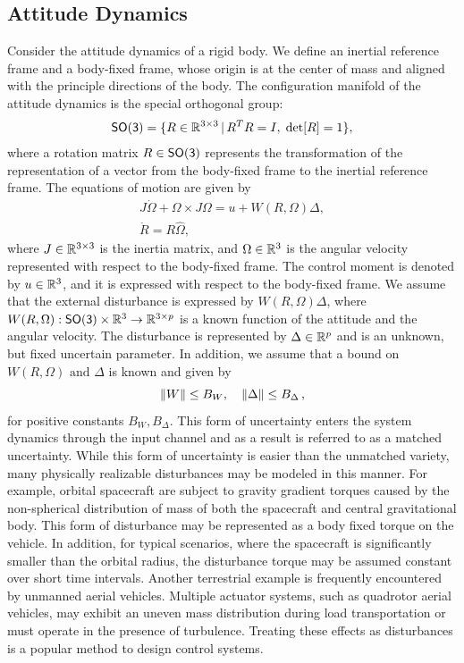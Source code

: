 \documentclass[10pt,fleqn]{IJCAS}  %
\begin{document}
\begin{multicols}{2}
\subsection{Attitude Dynamics}\label{sec:att_dyn}
Consider the attitude dynamics of a rigid body.
We define an inertial reference frame and a body-fixed frame, whose origin is at the center of mass and aligned with the principle directions of the body. 
The configuration manifold of the attitude dynamics is the special orthogonal group:
\begin{align*}
	\mathsf{SO(3)} = \{R\in\mathbb{R}^{3\times 3}\,|\, R^TR=I,\;\mathrm{det}[R]=1\} ,
\end{align*}
where a rotation matrix $R\in\mathsf{SO(3)}$ represents the transformation of the representation of a vector from the body-fixed frame to the inertial reference frame. 
The equations of motion are given by
\begin{gather}
	J\dot\Omega + \Omega\times J\Omega = u+W(R,\Omega)\Delta ,\label{eqn:Wdot}\\
	\dot R = R\hat\Omega ,\label{eqn:Rdot}
\end{gather}
where $J\in\mathbb{R}^{3\times 3}$ is the inertia matrix, and $\Omega\in\mathbb{R}^{3}$ is the angular velocity represented with respect to the body-fixed frame. 
The control moment is denoted by $u\in\mathbb{R}^{3}$, and it is expressed with respect to the body-fixed frame. 
We assume that the external disturbance is expressed by $W(R,\Omega)\Delta$, where $W(R,\Omega):\mathsf{SO(3)}\times\mathbb{R}^{3}\rightarrow \mathbb{R}^{3\times p}$ is a known function of the attitude and the angular velocity.
The disturbance is represented by $\Delta\in\mathbb{R}^{p}$ and is an unknown, but fixed uncertain parameter.
In addition, we assume that a bound on \( W(R, \Omega) \text{ and } \Delta \) is known and given by
\begin{equation}
	\left\| W \right\| \leq B_W , \quad \left\| \Delta \right\| \leq B_\Delta \,, \label{eqn:W_bound}
\end{equation}
for positive constants \( B_W, B_\Delta\).
This form of uncertainty enters the system dynamics through the input channel and as a result is referred to as a matched uncertainty. 
While this form of uncertainty is easier than the unmatched variety, many physically realizable disturbances may be modeled in this manner.
For example, orbital spacecraft are subject to gravity gradient torques caused by the non-spherical distribution of mass of both the spacecraft and central gravitational body.
This form of disturbance may be represented as a body fixed torque on the vehicle.
In addition, for typical scenarios, where the spacecraft is significantly smaller than the orbital radius, the disturbance torque may be assumed constant over short time intervals.
Another terrestrial example is frequently encountered by unmanned aerial vehicles. 
Multiple actuator systems, such as quadrotor aerial vehicles, may exhibit an uneven mass distribution during load transportation or must operate in the presence of turbulence. 
Treating these effects as disturbances is a popular method to design control systems.


\end{multicols}
\end{document}

